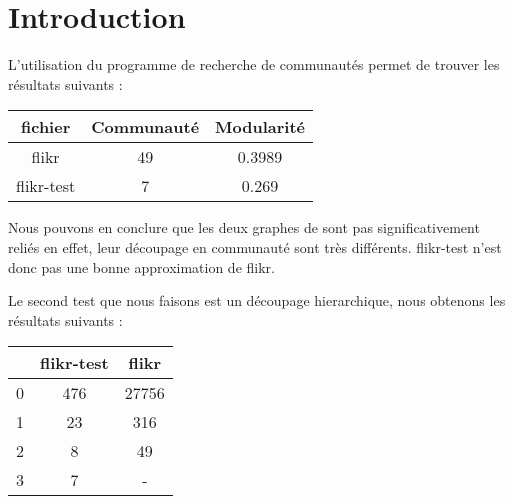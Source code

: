 \section{Introduction}

L'utilisation du programme de recherche de communautés permet de trouver
les résultats suivants :

\begin{center}
\begin{tabular}{|c|c|c|}
  fichier & Communauté & Modularité \\ \hline
  flikr & 49 & 0.3989\\
  flikr-test & 7 & 0.269 \\
\end{tabular}
\end{center}

Nous pouvons en conclure que les deux graphes de sont pas significativement reliés
en effet, leur découpage en communauté sont très différents. flikr-test n'est donc
pas une bonne approximation de flikr.

Le second test que nous faisons est un découpage hierarchique, nous obtenons les résultats
suivants :

\begin{center}
\begin{tabular}{|c|c|c|}
 & flikr-test & flikr \\ \hline
0 & 476 & 27756 \\
1 & 23 & 316 \\
2 & 8 & 49 \\
3 & 7 & - \\
\end{tabular}
\end{center}
